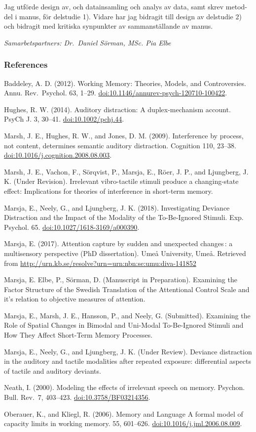 \documentclass[]{article}
\begin{document}
Jag utförde design av, och datainsamling och analys av data, samt skrev
metod-del i manus, för delstudie 1). Vidare har jag bidragit till design
av delstudie 2) och bidragit med kritiska synpunkter av sammanställande
av manus.

\emph{Samarbetspartners: Dr.~Daniel Sörman, MSc. Pia Elbe}

\newpage

\subsubsection{References}\label{references}

Baddeley, A. D. (2012). Working Memory: Theories, Models, and
Controversies. Annu. Rev.~Psychol. 63, 1--29.
\url{doi:10.1146/annurev-psych-120710-100422}.

Hughes, R. W. (2014). Auditory distraction: A duplex-mechanism account.
PsyCh J. 3, 30--41. \url{doi:10.1002/pchj.44}.

Marsh, J. E., Hughes, R. W., and Jones, D. M. (2009). Interference by
process, not content, determines semantic auditory distraction.
Cognition 110, 23--38. \url{doi:10.1016/j.cognition.2008.08.003}.

Marsh, J. E., Vachon, F., Sörqvist, P., Marsja, E., Röer, J. P., and
Ljungberg, J. K. (Under Revision). Irrelevant vibro-tactile stimuli
produce a changing-state effect: Implications for theories of
interference in short-term memory.

Marsja, E., Neely, G., and Ljungberg, J. K. (2018). Investigating
Deviance Distraction and the Impact of the Modality of the To-Be-Ignored
Stimuli. Exp. Psychol. 65. \url{doi:10.1027/1618-3169/a000390}.

Marsja, E. (2017). Attention capture by sudden and unexpected changes\,:
a multisensory perspective (PhD dissertation). Umeå University, Umeå.
Retrieved from
\url{http://urn.kb.se/resolve?urn=urn:nbn:se:umu:diva-141852}

Marsja, E. Elbe, P., Sörman, D. (Manuscript in Preparation). Examining
the Factor Structure of the Swedish Translation of the Attentional
Control Scale and it's relation to objective measures of attention.

Marsja, E., Marsh, J. E., Hansson, P., and Neely, G. (Submitted).
Examining the Role of Spatial Changes in Bimodal and Uni-Modal
To-Be-Ignored Stimuli and How They Affect Short-Term Memory Processes.

Marsja, E., Neely, G., and Ljungberg, J. K. (Under Review). Deviance
distraction in the auditory and tactile modalities after repeated
exposure: differential aspects of tactile and auditory deviants.

Neath, I. (2000). Modeling the effects of irrelevant speech on memory.
Psychon. Bull. Rev.~7, 403--423. \url{doi:10.3758/BF03214356}.

Oberauer, K., and Kliegl, R. (2006). Memory and Language A formal model
of capacity limits in working memory. 55, 601--626.
\url{doi:10.1016/j.jml.2006.08.009}.
\end{document}
